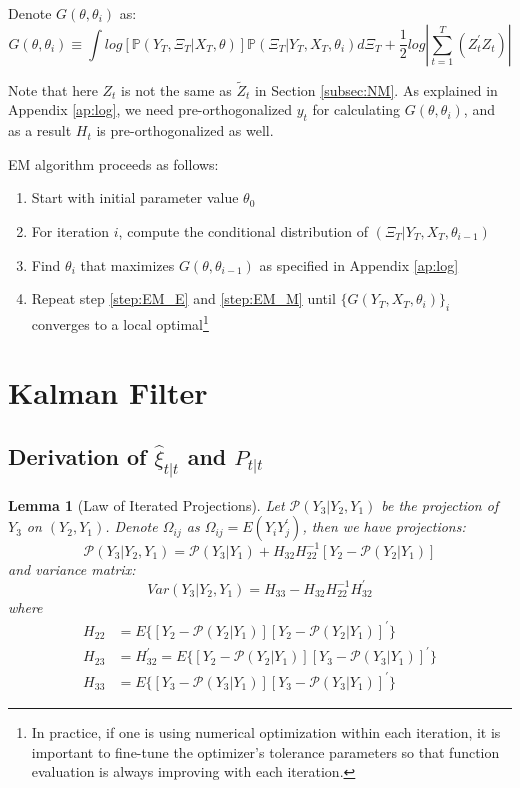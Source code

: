 \documentclass[10pt, titlepage]{article}
\newtheorem{lemma}{Lemma}
\newenvironment{boenumerate}
    {\begin{enumerate}\renewcommand\labelenumi{\textbf\theenumi}}
    {\end{enumerate}}
\numberwithin{equation}{section}
\begin{document}
Denote $G(\theta,\theta_i)$ as: 
\[
    G(\theta,\theta_i) \equiv \int log[\mathbb{P}(Y_T,\Xi_T|X_T,\theta)]\mathbb{P}(\Xi_T|Y_T,X_T,\theta_i)d\Xi_T + \frac{1}{2}log\left|\sum_{t=1}^{T}(Z_t^{'}Z_t)\right| 
\]

Note that here $Z_t$ is not the same as $\tilde{Z}_t$ in Section \ref{subsec:NM}. As explained in Appendix \ref{ap:log}, we need pre-orthogonalized $y_t$ for calculating $G(\theta,\theta_i)$, and as a result $H_t$ is pre-orthogonalized as well. 

EM algorithm proceeds as follows:
\begin{boenumerate}
    \item Start with initial parameter value $\theta_0$
    \item \label{step:EM_E} For iteration $i$, compute the conditional distribution of $(\Xi_T|Y_T,X_T,\theta_{i-1})$
    \item \label{step:EM_M} Find $\theta_{i}$ that maximizes $G(\theta,\theta_{i-1})$ as specified in Appendix \ref{ap:log} 
    \item Repeat step \ref{step:EM_E} and \ref{step:EM_M} until $\{G(Y_T,X_T,\theta_i)\}_i$ converges to a local optimal\footnote{In practice, if one is using numerical optimization within each iteration, it is important to fine-tune the optimizer's tolerance parameters so that function evaluation is always improving with each iteration.}
\end{boenumerate}

\pagebreak
\printbibliography
\pagebreak
\appendix

\section{Kalman Filter}
\subsection{Derivation of \texorpdfstring{$\hat{\xi}_{t|t}$}{} and \texorpdfstring{$P_{t|t}$}{}} \label{ap:iter_proj}
\begin{lemma}[Law of Iterated Projections] \label{lem:1}
    Let $\mathcal{P}(Y_3|Y_2,Y_1)$ be the projection of $Y_3$ on $(Y_2, Y_1)$. Denote $\Omega_{ij}$ as $\Omega_{ij} = E(Y_iY_j^{'})$, then we have projections:
    \[
        \mathcal{P}(Y_3|Y_2,Y_1) = \mathcal{P}(Y_3|Y_1)+H_{32}H_{22}^{-1}[Y_2 - \mathcal{P}(Y_2|Y_1)]
    \]
    and variance matrix:
    \[
        Var(Y_3|Y_2,Y_1) = H_{33} - H_{32}H_{22}^{-1}H_{32}^{'}
    \]
    where 
    \begin{align*}
        H_{22} &= E\{[Y_2-\mathcal{P}(Y_2|Y_1)][Y_2-\mathcal{P}(Y_2|Y_1)]^{'}\} \\
        H_{23} &= H_{32}^{'} = E\{[Y_2-\mathcal{P}(Y_2|Y_1)][Y_3-\mathcal{P}(Y_3|Y_1)]^{'}\} \\
        H_{33} &= E\{[Y_3-\mathcal{P}(Y_3|Y_1)][Y_3-\mathcal{P}(Y_3|Y_1)]^{'}\}
    \end{align*}
\end{lemma}
\end{document}

